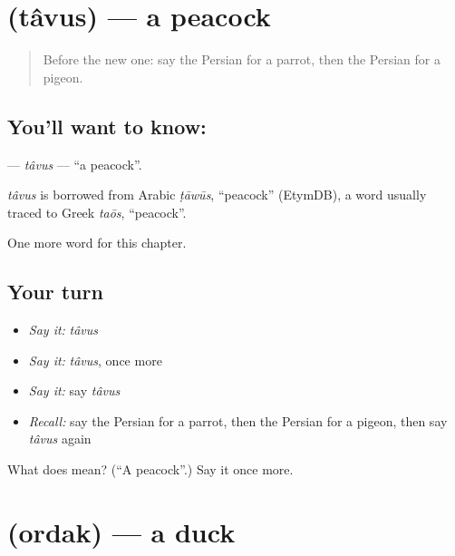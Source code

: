 \section[\texorpdfstring{\fa{طاووس} (tâvus)}{طاووس (tâvus)}]{ (tâvus) — a peacock}

\label{lesson:FA-C106-tavus}



\begin{quote}
Before the new one: say the Persian for a parrot, then the Persian for a pigeon.
\end{quote}

\subsection*{You'll want to know: }
\textbf{} — \emph{tâvus} — \textquotedblleft{}a peacock\textquotedblright{}.

\begin{cousinweb}
\emph{tâvus} is borrowed from Arabic \emph{ṭāwūs}, \textquotedblleft{}peacock\textquotedblright{} (EtymDB), a word usually traced to Greek \emph{taōs}, \textquotedblleft{}peacock\textquotedblright{}.
\end{cousinweb}

\begin{grammarlens}[title={What you've built}]
One more word for this chapter.
\end{grammarlens}

\subsection*{Your turn}
\begin{itemize}
\raggedright
  \item \emph{Say it:} \emph{tâvus}
  \item \emph{Say it:} \emph{tâvus}, once more
  \item \emph{Say it:} say \emph{tâvus}
  \item \emph{Recall:} say the Persian for a parrot, then the Persian for a pigeon, then say \emph{tâvus} again
\end{itemize}

\begin{tcolorbox}[breakable,colback=teal!4,colframe=teal!35!black,title={Before you move on}]
What does  mean? (\textquotedblleft{}A peacock\textquotedblright{}.) Say it once more.
\end{tcolorbox}
\section[\texorpdfstring{\fa{اردک} (ordak)}{اردک (ordak)}]{ (ordak) — a duck}

